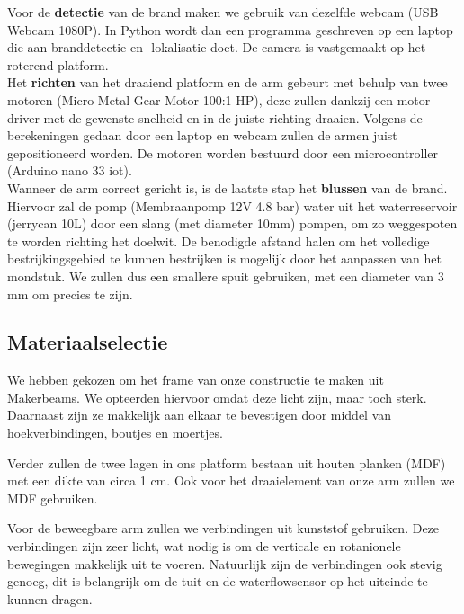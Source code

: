 \documentclass[kulak]{kulakarticle} %
\begin{document}
		Voor de \textbf{detectie} van de brand maken we gebruik van dezelfde webcam (USB Webcam 1080P). In Python wordt dan een programma geschreven op een laptop die aan branddetectie en -lokalisatie doet. De camera is vastgemaakt op het roterend platform. \\
		
		Het \textbf{richten} van het draaiend platform en de arm gebeurt met behulp van twee motoren (Micro Metal Gear Motor 100:1 HP), deze zullen dankzij een motor driver met de gewenste snelheid en in de juiste richting draaien. Volgens de berekeningen gedaan door een laptop en webcam zullen de armen juist gepositioneerd worden. De motoren worden bestuurd door een microcontroller (Arduino nano 33 iot). \\
		
		Wanneer de arm correct gericht is, is de laatste stap het \textbf{blussen} van de brand. Hiervoor zal de pomp (Membraanpomp 12V 4.8 bar) water uit het waterreservoir (jerrycan 10L) door een slang (met diameter 10mm) pompen, om zo weggespoten te worden richting het doelwit. De benodigde afstand halen om het volledige bestrijkingsgebied te kunnen bestrijken is mogelijk door het aanpassen van het mondstuk. We zullen dus een smallere spuit gebruiken, met een diameter van 3 mm om precies te zijn.\\
		
	\subsection{Materiaalselectie}
	
		We hebben gekozen om het frame van onze constructie te maken uit Makerbeams. We opteerden hiervoor omdat deze licht zijn, maar toch sterk. Daarnaast zijn ze makkelijk aan elkaar te bevestigen door middel van hoekverbindingen, boutjes en moertjes.
		
		Verder zullen de twee lagen in ons platform bestaan uit houten planken (MDF) met een dikte van circa 1 cm. Ook voor het draaielement van onze arm zullen we MDF gebruiken.
		
		Voor de beweegbare arm zullen we verbindingen uit kunststof gebruiken. Deze verbindingen zijn zeer licht, wat nodig is om de verticale en rotanionele bewegingen makkelijk uit te voeren. Natuurlijk zijn de verbindingen ook stevig genoeg, dit is belangrijk om de tuit en de waterflowsensor op het uiteinde te kunnen dragen.
\end{document}
